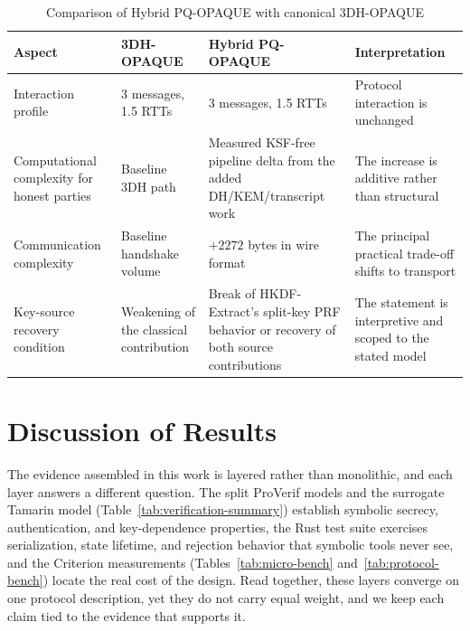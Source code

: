 \documentclass[preprint,12pt]{elsarticle}
\theoremstyle{remark}
\begin{document}
\begin{table}[htbp]
\caption{Comparison of Hybrid PQ-OPAQUE with canonical 3DH-OPAQUE}
\label{tab:baseline-comparison}
\centering\scriptsize
\begin{tabularx}{\textwidth}{@{}L{3.3cm}L{2.9cm}L{3.1cm}X@{}}
\toprule
Aspect & 3DH-OPAQUE & Hybrid PQ-OPAQUE & Interpretation \\
\midrule
Interaction profile & 3 messages, 1.5 RTTs & 3 messages, 1.5 RTTs & Protocol interaction is unchanged \\
Computational complexity for honest parties & Baseline 3DH path & Measured KSF-free pipeline delta from the added DH/KEM/transcript work & The increase is additive rather than structural \\
Communication complexity & Baseline handshake volume & $+2272$ bytes in wire format & The principal practical trade-off shifts to transport \\
Key-source recovery condition & Weakening of the classical contribution & Break of HKDF-Extract's split-key PRF behavior or recovery of both source contributions & The statement is interpretive and scoped to the stated model \\
\bottomrule
\end{tabularx}
\end{table}

\section{Discussion of Results}

The evidence assembled in this work is layered rather than monolithic, and each
layer answers a different question. The split ProVerif models and the surrogate
Tamarin model (Table~\ref{tab:verification-summary}) establish symbolic secrecy,
authentication, and key-dependence properties, the Rust test suite exercises
serialization, state lifetime, and rejection behavior that symbolic tools never
see, and the Criterion measurements (Tables~\ref{tab:micro-bench}
and~\ref{tab:protocol-bench}) locate the real cost of the design. Read together,
these layers converge on one protocol description, yet they do not carry equal
weight, and we keep each claim tied to the evidence that supports it.
\end{document}
